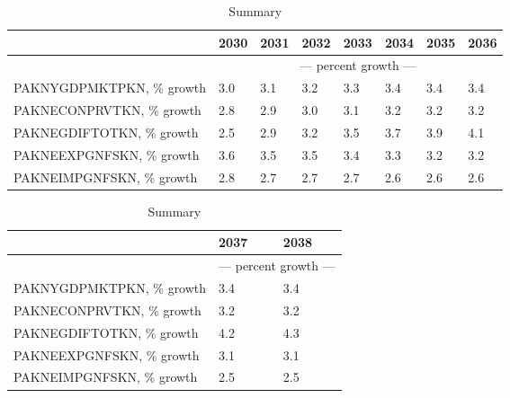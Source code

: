 \documentclass{article}
\begin{document}
 \begin{table}
\caption{Summary}
\begin{tabular}{llllllll}
\toprule
 & 2030 & 2031 & 2032 & 2033 & 2034 & 2035 & 2036 \\
\midrule
&\multicolumn{7}{c}{--- percent growth ---}                                                                                                                                             \\
PAKNYGDPMKTPKN, \% growth &                  3.0 &                  3.1 &                  3.2 &                  3.3 &                  3.4 &                  3.4 &                  3.4 \\
PAKNECONPRVTKN, \% growth &                  2.8 &                  2.9 &                  3.0 &                  3.1 &                  3.2 &                  3.2 &                  3.2 \\
PAKNEGDIFTOTKN, \% growth &                  2.5 &                  2.9 &                  3.2 &                  3.5 &                  3.7 &                  3.9 &                  4.1 \\
PAKNEEXPGNFSKN, \% growth &                  3.6 &                  3.5 &                  3.5 &                  3.4 &                  3.3 &                  3.2 &                  3.2 \\
PAKNEIMPGNFSKN, \% growth &                  2.8 &                  2.7 &                  2.7 &                  2.7 &                  2.6 &                  2.6 &                  2.6 \\
\bottomrule
\end{tabular}
\end{table}
 \begin{table}
\caption{Summary}
\begin{tabular}{lll}
\toprule
 & 2037 & 2038 \\
\midrule
&\multicolumn{2}{c}{--- percent growth ---}                                         \\
PAKNYGDPMKTPKN, \% growth &                  3.4 &                  3.4 \\
PAKNECONPRVTKN, \% growth &                  3.2 &                  3.2 \\
PAKNEGDIFTOTKN, \% growth &                  4.2 &                  4.3 \\
PAKNEEXPGNFSKN, \% growth &                  3.1 &                  3.1 \\
PAKNEIMPGNFSKN, \% growth &                  2.5 &                  2.5 \\
\bottomrule
\end{tabular}
\end{table}
\end{document}

